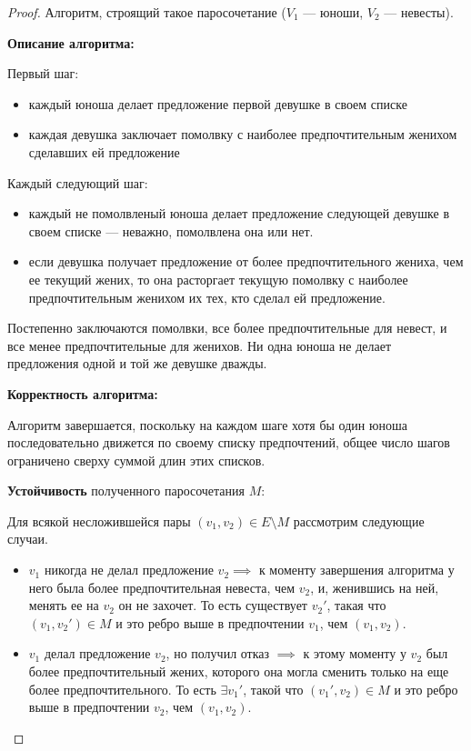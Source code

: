 \begin{proof}
    Алгоритм, строящий такое паросочетание ($V_1$ --- юноши, $V_2$ --- невесты).

    \textbf{Описание алгоритма:}

    Первый шаг:
    \begin{itemize}
        \item каждый юноша делает предложение первой девушке в своем списке
        
        \item каждая девушка заключает помолвку с наиболее предпочтительным женихом сделавших ей предложение
    \end{itemize}
    
    Каждый следующий шаг:
    \begin{itemize}
        \item каждый не помолвленый юноша делает предложение следующей девушке в своем списке --- неважно, помолвлена она или нет.
        
        \item если девушка получает предложение от более предпочтительного жениха, чем ее текущий жених, то она расторгает текущую помолвку с наиболее предпочтительным женихом их тех, кто сделал ей предложение.
    \end{itemize}
    
    Постепенно заключаются помолвки, все более предпочтительные для невест, и все менее предпочтительные для женихов. Ни одна юноша не делает предложения одной и той же девушке дважды.

    \textbf{Корректность алгоритма:}

    Алгоритм завершается, поскольку на каждом шаге хотя бы один юноша последовательно движется по своему списку предпочтений, общее число шагов ограничено сверху суммой длин этих списков.
    
    \textbf{Устойчивость} полученного паросочетания $M$:

    Для всякой несложившейся пары $(v_1, v_2) \in E \setminus M$ рассмотрим следующие случаи.
    \begin{itemize}
        \item $v_1$ никогда не делал предложение $v_2 \implies$ к моменту завершения алгоритма у него была более предпочтительная невеста, чем $v_2$, и, женившись на ней, менять ее на $v_2$ он не захочет. То есть существует $v_2'$, такая что $(v_1, v_2') \in M$ и это ребро выше в предпочтении $v_1$, чем $(v_1,v_2)$.
        
        \item $v_1$ делал предложение $v_2$, но получил отказ $\implies$ к этому моменту у $v_2$ был более предпочтительный жених, которого она могла сменить только на еще более предпочтительного. То есть $\exists v_1'$, такой что $(v_1', v_2) \in M$ и это ребро выше в предпочтении $v_2$, чем $(v_1,v_2)$.
        

\end{itemize}
\end{proof}
